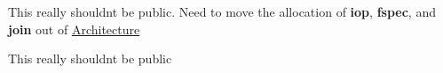 
\begin{DoxyRefList}
\item[Member \mbox{\hyperlink{class_addr_space_manager_a89658bd677414a271a918f0f37af0bd6}{Addr\+Space\+Manager::insert\+Space}} (\mbox{\hyperlink{class_addr_space}{Addr\+Space}} $\ast$spc)]\label{todo__todo000002}%
%
This really shouldn\textquotesingle{}t be public. Need to move the allocation of {\bfseries{iop}}, {\bfseries{fspec}}, and {\bfseries{join}} out of \mbox{\hyperlink{class_architecture}{Architecture}}  
\item[Member \mbox{\hyperlink{class_addr_space_manager_aa2804a97aa4900bf84f0c2ff064847ec}{Addr\+Space\+Manager::set\+Default\+Space}} (int4 index)]\label{todo__todo000001}%
%
This really shouldn\textquotesingle{}t be public 
\end{DoxyRefList}
